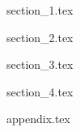 \documentclass[a4paper,11pt]{report}
\begin{document}
	


\pagebreak
\tableofcontents
\pagebreak

\setcounter{page}{1}

{section_1.tex}

{section_2.tex}

{section_3.tex}

{section_4.tex}

\printbibliography[title={References}, heading=bibsection]

\newpage

{appendix.tex}
\end{document}
